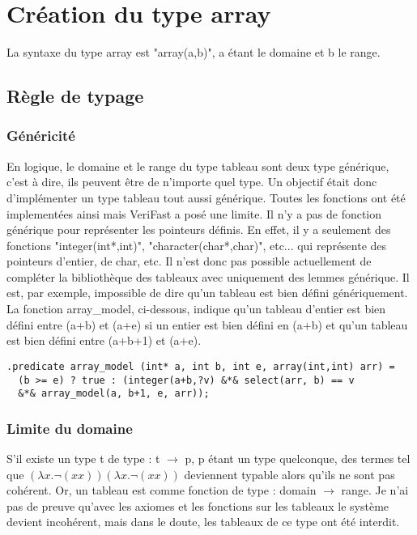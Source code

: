 \documentclass[9pt]{book}
\newcommand{\verifast}{VeriFast}
\begin{document}
	\section{Cr\'eation du type array}
		La syntaxe du type array est "array(a,b)", a \'etant le domaine et b le range.
		\subsection{R\`egle de typage}
			\subsubsection{G\'en\'ericit\'e}
			En logique, le domaine et le range du type tableau sont deux type g\'en\'erique, c'est \`a dire, ils peuvent \^etre de n'importe quel type. Un objectif \'etait donc d'impl\'ementer un type tableau tout aussi g\'en\'erique. Toutes les fonctions ont \'et\'e implement\'ees ainsi mais \verifast{} a pos\'e une limite. Il n'y a pas de fonction g\'en\'erique pour repr\'esenter les pointeurs d\'efinis. En effet, il y a seulement des fonctions "integer(int*,int)", "character(char*,char)", etc... qui repr\'esente des pointeurs d'entier, de char, etc. Il n'est donc pas possible actuellement de compl\'eter la biblioth\`eque des tableaux avec uniquement des lemmes g\'en\'erique. Il est, par exemple, impossible de dire qu'un tableau est bien d\'efini g\'en\'eriquement. La fonction array\_model, ci-dessous, indique qu'un tableau d'entier est bien d\'efini entre (a+b) et (a+e) si un entier est bien d\'efini en (a+b) et qu'un tableau est bien d\'efini entre (a+b+1) et (a+e).
\begin{lstlisting}
.predicate array_model (int* a, int b, int e, array(int,int) arr) =
  (b >= e) ? true : (integer(a+b,?v) &*& select(arr, b) == v
  &*& array_model(a, b+1, e, arr));
\end{lstlisting}
			\subsubsection{Limite du domaine}
			S'il existe un type t de type : t $\rightarrow$ p, p \'etant un type quelconque, des termes tel que $(\lambda x. \neg(xx))(\lambda x.\neg(xx))$ 	deviennent typable alors qu'ils ne sont pas coh\'erent. Or, un tableau est comme fonction de type : domain $\rightarrow$ range. Je n'ai pas de preuve qu'avec les axiomes et les fonctions sur les tableaux le syst\`eme devient incoh\'erent, mais dans le doute, les tableaux de ce type ont \'et\'e interdit.
\end{document}
